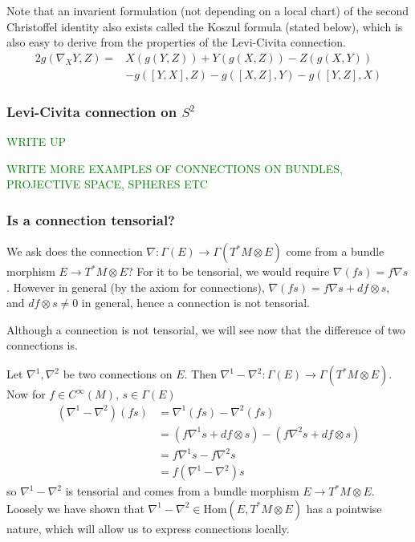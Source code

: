 \documentclass[a4paper]{article}
\theoremstyle{definition} \newtheorem*{definition}{Definition}
\theoremstyle{definition} \newtheorem*{definitions}{Definitions}
\theoremstyle{plain} \newtheorem{theorem}{Theorem}[section]
\theoremstyle{plain} \newtheorem{proposition}[theorem]{Proposition}
\theoremstyle{plain} \newtheorem{corollary}[theorem]{Corollary}
\theoremstyle{plain} \newtheorem{lemma}[theorem]{Lemma}
\theoremstyle{plain} \newtheorem{example}[theorem]{Example}
\newcommand{\finish}[1]{\textcolor{green}{#1}}
\newcommand{\Hom}{\text{Hom}}
\newcommand{\smooth}{C^\infty}
\begin{document}
Note that an invarient formulation (not depending on a local chart) of the second Christoffel identity also exists called the Koszul formula (stated below), which is also easy to derive from the properties of the Levi-Civita connection.
\begin{align*}
2g(\nabla_XY, Z) = & X(g(Y,Z))+Y(g(X,Z))-Z(g(X,Y)) \\
& -g([Y,X],Z)-g([X,Z],Y)-g([Y,Z],X)    
\end{align*}

\subsubsection{Levi-Civita connection on $S^2$}
\finish{WRITE UP}

\finish{WRITE MORE EXAMPLES OF CONNECTIONS ON BUNDLES, PROJECTIVE SPACE, SPHERES ETC}

\subsubsection{Is a connection tensorial?}
We ask does the connection $\nabla:\Gamma(E)\to \Gamma(T^*M\otimes E)$ come from a bundle morphism $E\to T^*M\otimes E$? For it to be tensorial, we would require $\nabla(fs)=f\nabla s$. However in general (by the axiom for connections), $\nabla(fs)=f\nabla s + df\otimes s$, and $df\otimes s \neq 0$ in general, hence a connection is not tensorial.

Although a connection is not tensorial, we will see now that the difference of two connections is.

Let $\nabla^1, \nabla^2$ be two connections on $E$. Then $\nabla^1-\nabla^2:\Gamma(E)\to \Gamma(T^*M\otimes E)$. Now for $f\in \smooth(M)$, $s\in \Gamma(E)$
\begin{align*}
(\nabla^1 - \nabla^2)(fs)
& = \nabla^1(fs) - \nabla^2(fs) \\
& = (f\nabla^1 s + df \otimes s)
- (f\nabla^2 s + df \otimes s) \\
& = f\nabla^1 s - f\nabla^2 s \\
& = f(\nabla^1 - \nabla^2) s
\end{align*}
so $\nabla^1-\nabla^2$ is tensorial and comes from a bundle morphism $E\to T^*M\otimes E$. Loosely we have shown that $\nabla^1-\nabla^2\in \Hom (E, T^*M\otimes E)$ has a pointwise nature, which will allow us to express connections locally.
\end{document}

